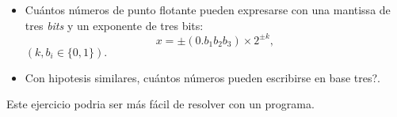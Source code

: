 \documentclass[spanish]{amsart}
\begin{document}
\begin{exercise}
  \begin{itemize}
  \item Cuántos números de punto flotante pueden expresarse con una mantissa de tres \emph{bits} y un exponente de tres bits:
\[x = \pm(0.b_1b_2b_3) \times 2^{\pm k},\]
$(k, b_i \in \{0, 1\}).$
\item Con hipotesis similares, cuántos números pueden escribirse en base tres?.
  \end{itemize}
Este ejercicio podria ser más fácil de resolver con un programa.
\end{exercise}
\end{document}
